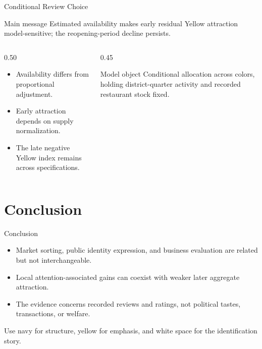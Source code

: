 \documentclass[aspectratio=169,11pt]{beamer}
\begin{document}
\begin{frame}{Conditional Review Choice}
\begin{PMpanel}{Main message}
Estimated availability makes early residual Yellow attraction model-sensitive; the reopening-period decline persists.
\end{PMpanel}

\vspace{.28cm}
\begin{columns}[T,totalwidth=\textwidth]
  \begin{column}{0.50\textwidth}
    \begin{itemize}
      \item Availability differs from proportional adjustment.
      \item Early attraction depends on supply normalization.
      \item The late negative Yellow index remains across specifications.
    \end{itemize}
  \end{column}
  \begin{column}{0.45\textwidth}
    \begin{PMpanel}{Model object}
      Conditional allocation across colors, holding district-quarter activity and recorded restaurant stock fixed.
    \end{PMpanel}
  \end{column}
\end{columns}
\end{frame}

\section{Conclusion}

\begin{frame}{Conclusion}
\begin{itemize}
  \item Market sorting, public identity expression, and business evaluation are related but not interchangeable.
  \item Local attention-associated gains can coexist with weaker later aggregate attraction.
  \item The evidence concerns recorded reviews and ratings, not political tastes, transactions, or welfare.
\end{itemize}
\vspace{.45cm}
\begin{PMtakeaway}
Use navy for structure, yellow for emphasis, and white space for the identification story.
\end{PMtakeaway}
\end{frame}
\end{document}
